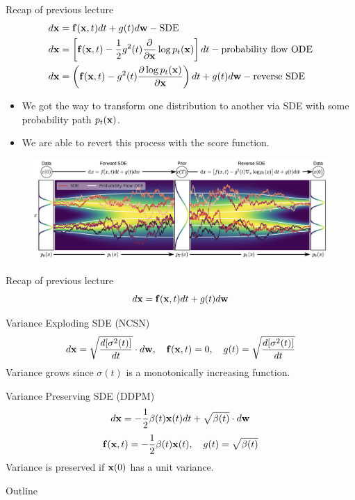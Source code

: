\begin{frame}{Recap of previous lecture}
	\vspace{-0.5cm}
	\begin{align*}
		d\mathbf{x} &= \mathbf{f}(\mathbf{x}, t) dt + g(t) d \mathbf{w} - \text{SDE} \\
		d\mathbf{x} &= \left[\mathbf{f}(\mathbf{x}, t) -\frac{1}{2} g^2(t) \frac{\partial}{\partial \mathbf{x}} \log p_t(\mathbf{x}) \right] dt - \text{probability flow ODE} \\
		d\mathbf{x} &= \left(\mathbf{f}(\mathbf{x}, t) - g^2(t) \frac{\partial \log p_t(\mathbf{x})}{\partial \mathbf{x}}\right) dt + g(t) d \mathbf{w} - \text{reverse SDE}
	\end{align*}
	\vspace{-0.5cm}
	\begin{itemize}
		\item We got the way to transform one distribution to another via SDE with some probability path $p_t(\mathbf{x})$.
		\item We are able to revert this process with the score function.
	\end{itemize}
	\vspace{-0.3cm}
	\begin{figure}
		\includegraphics[width=0.9\linewidth]{figs/sde}
	\end{figure}
\end{frame}
\begin{frame}{Recap of previous lecture}
	\vspace{-0.3cm}
	\[
		d\mathbf{x} = \mathbf{f}(\mathbf{x}, t) dt + g(t) d \mathbf{w}
	\]
	\vspace{-0.3cm}
	\begin{block}{Variance Exploding SDE (NCSN)}
		\vspace{-0.5cm}
		\[
			d \mathbf{x} = \sqrt{\frac{ d [\sigma^2(t)]}{dt}} \cdot d \mathbf{w}, \quad \mathbf{f}(\mathbf{x}, t) = 0, \quad g(t) = \sqrt{\frac{ d [\sigma^2(t)]}{dt}} 
		\]
		Variance grows since $\sigma(t)$ is a monotonically increasing function.
	\end{block}
	\begin{block}{Variance Preserving SDE (DDPM)}
		\vspace{-0.3cm}
		\[
			d \mathbf{x} = - \frac{1}{2} \beta(t) \mathbf{x}(t) dt + \sqrt{\beta(t)} \cdot d \mathbf{w}
		\]
		\[
			\mathbf{f}(\mathbf{x}, t) = - \frac{1}{2} \beta(t) \mathbf{x}(t) , \quad g(t) = \sqrt{\beta(t)} 
		\]
		Variance is preserved if $\mathbf{x}(0)$ has a unit variance.
	\end{block}
\end{frame}
\begin{frame}{Outline}
	\tableofcontents
\end{frame}
